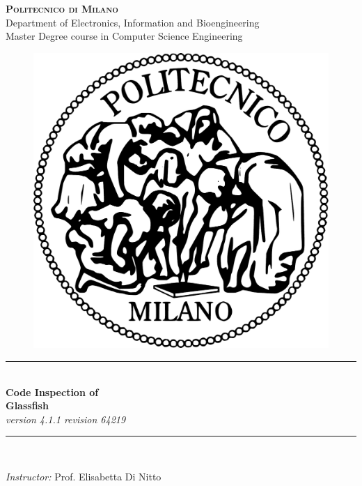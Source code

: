 \documentclass[12pt]{report}
\begin{document}
\pagestyle{empty}

\cleardoublepage


\begin{titlepage}

\newcommand{\HRule}{\rule{\linewidth}{0.5mm}} %

\center %

\textsc{\huge \bf{Politecnico di Milano}}\\[0.5cm]
\textsf{\Large Department of Electronics, Information and Bioengineering}\\[0.25cm] %
\textsf{\large Master Degree course in Computer Science Engineering}\\[0.5cm] %

\begin{figure}[h]
	\centering
	\includegraphics[width = 5 cm]{Figures/PoliMi}
\end{figure}


\HRule \\

\Huge \textbf {Code Inspection of} \\[0.2cm]
\LARGE \textbf {Glassfish} \\
\large \textit {version 4.1.1 revision 64219}
\\ %
\HRule \\[1cm]


\begin{flushleft}
	\large \textit{Instructor:} Prof. Elisabetta Di Nitto \\[0.5cm]


\end{flushleft}
\end{titlepage}
\end{document}
